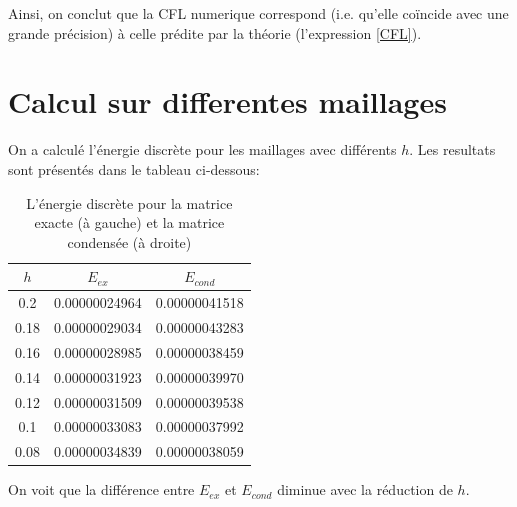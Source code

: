 \documentclass[12pt]{article}
\begin{document}
Ainsi, on conclut que la CFL numerique correspond (i.e. qu'elle coïncide avec une grande précision) à celle prédite par la théorie (l'expression \eqref{CFL}).

\section{Calcul sur differentes maillages}
On a calculé l'énergie discrète pour les maillages avec différents $h$. Les resultats sont présentés dans le tableau ci-dessous:
	\begin{table}[H]
	\begin{center}
		\begin{tabular}{|c|c|c|}
			\hline
			$h$ & $E_{ex}$ & $E_{cond}$ \\
			\hline
			0.2 & 0.00000024964 &  0.00000041518 \\ 
			0.18 & 0.00000029034 & 0.00000043283 \\
			0.16 & 0.00000028985 & 0.00000038459 \\
			0.14 & 0.00000031923 & 0.00000039970 \\
			0.12 & 0.00000031509 & 0.00000039538 \\
			0.1 & 0.00000033083 & 0.00000037992 \\
			0.08 & 0.00000034839 & 0.00000038059 \\
			\hline
		\end{tabular}
	\end{center}
\caption{\label{tab:energie} L'énergie discrète pour la matrice exacte (à gauche) et la matrice condensée (à droite)}
\end{table} 
\noindent On voit que la différence entre $E_{ex}$ et $E_{cond}$ diminue avec la réduction de $h$.
\end{document}
